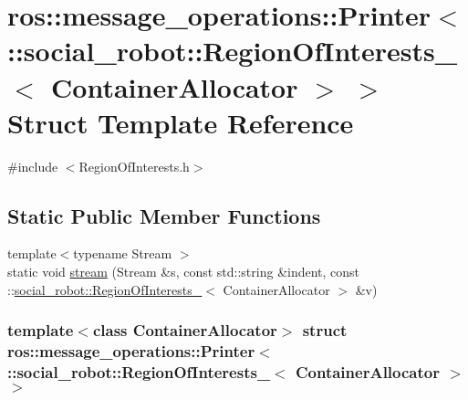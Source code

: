 \hypertarget{structros_1_1message__operations_1_1Printer_3_01_1_1social__robot_1_1RegionOfInterests___3_01ContainerAllocator_01_4_01_4}{
\section{ros::message\_\-operations::Printer$<$ ::social\_\-robot::RegionOfInterests\_\-$<$ ContainerAllocator $>$ $>$ Struct Template Reference}
\label{structros_1_1message__operations_1_1Printer_3_01_1_1social__robot_1_1RegionOfInterests___3_01ContainerAllocator_01_4_01_4}
}


{\ttfamily \#include $<$RegionOfInterests.h$>$}

\subsection*{Static Public Member Functions}
\begin{DoxyCompactItemize}
\item 
{\footnotesize template$<$typename Stream $>$ }\\static void \hyperlink{structros_1_1message__operations_1_1Printer_3_01_1_1social__robot_1_1RegionOfInterests___3_01ContainerAllocator_01_4_01_4_ac0d7193e5dd4b2ab332875d8d2fef3cd}{stream} (Stream \&s, const std::string \&indent, const ::\hyperlink{structsocial__robot_1_1RegionOfInterests__}{social\_\-robot::RegionOfInterests\_\-}$<$ ContainerAllocator $>$ \&v)
\end{DoxyCompactItemize}
\subsubsection*{template$<$class ContainerAllocator$>$ struct ros::message\_\-operations::Printer$<$ ::social\_\-robot::RegionOfInterests\_\-$<$ ContainerAllocator $>$ $>$}




